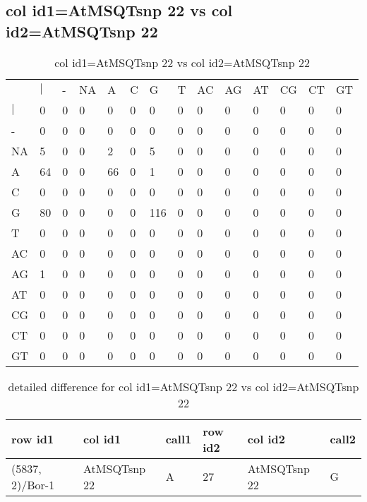 \subsection{col id1=AtMSQTsnp 22 vs col id2=AtMSQTsnp 22}
\begin{center}
\begin{longtable}{|l|l|l|l|l|l|l|l|l|l|l|l|l|l|}
\caption{col id1=AtMSQTsnp 22 vs col id2=AtMSQTsnp 22} \label{table_dm776}\\
\hline
\\
\hline
&$|$&-&NA&A&C&G&T&AC&AG&AT&CG&CT&GT\\
$|$&0&0&0&0&0&0&0&0&0&0&0&0&0\\
-&0&0&0&0&0&0&0&0&0&0&0&0&0\\
NA&5&0&0&2&0&5&0&0&0&0&0&0&0\\
A&64&0&0&66&0&1&0&0&0&0&0&0&0\\
C&0&0&0&0&0&0&0&0&0&0&0&0&0\\
G&80&0&0&0&0&116&0&0&0&0&0&0&0\\
T&0&0&0&0&0&0&0&0&0&0&0&0&0\\
AC&0&0&0&0&0&0&0&0&0&0&0&0&0\\
AG&1&0&0&0&0&0&0&0&0&0&0&0&0\\
AT&0&0&0&0&0&0&0&0&0&0&0&0&0\\
CG&0&0&0&0&0&0&0&0&0&0&0&0&0\\
CT&0&0&0&0&0&0&0&0&0&0&0&0&0\\
GT&0&0&0&0&0&0&0&0&0&0&0&0&0\\
\hline
\end{longtable}
\end{center}

\begin{center}
\begin{longtable}{|l|l|l|l|l|l|}
\caption{detailed difference for col id1=AtMSQTsnp 22 vs col id2=AtMSQTsnp 22} \label{table_dm777}\\
\hline
row id1&col id1&call1&row id2&col id2&call2\\
\hline
(5837, 2)/Bor-1&AtMSQTsnp 22&A&27&AtMSQTsnp 22&G\\
\hline
\end{longtable}
\end{center}

